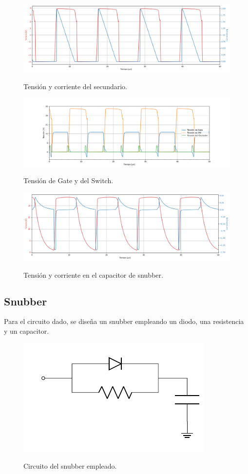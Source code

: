 \begin{figure}[H]
	\centering
	\includegraphics[width=0.9\linewidth]{ImagenesParteII/Secundario.png}
	\label{fig:secundario}
	\caption{Tensión y corriente del secundario.}
\end{figure}

\begin{figure}[H]
	\centering
	\includegraphics[width=\linewidth]{ImagenesParteII/TensionesVarias1.png}
	\label{fig:tensionesvarias}
	\caption{Tensión de Gate y del Switch.}
\end{figure}
\begin{figure}[H]
	\centering
	\includegraphics[width=0.9\linewidth]{ImagenesParteII/Cap_snub.png}
	\label{fig:tensionesvarias}
	\caption{Tensión y corriente en el capacitor de snubber.}
\end{figure}
\subsection{Snubber}

Para el circuito dado, se diseña un snubber empleando un diodo, una resistencia y un capacitor.
\begin{figure}[H]
	\centering
	\includegraphics[width=0.3\linewidth, page = 1]{ImagenesParteII/Snubber.pdf}
	\label{fig:snubber}
	\caption{Circuito del snubber empleado.}
\end{figure}

